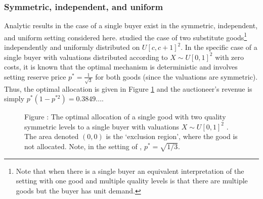 \subsubsection{Symmetric, independent, and uniform}

Analytic results in the case of a single buyer exist in the symmetric, independent, and uniform setting considered here. \autocite{pavlov2011optimal} studied the case of two substitute goods\footnote{Note that when there is a single buyer an equivalent interpretation of the setting with one good and multiple quality levels is that there are multiple goods but the buyer has unit demand.} independently and uniformly distributed on $U[c,c+1]^2$. In the specific case of a single buyer with valuations distributed according to $X \sim U[0,1]^2$ with zero costs, it is known that the optimal mechanism is deterministic and involves setting reserve price $p^* =\frac{1}{\sqrt{3}}$ for both goods (since the valuations are symmetric). Thus, the optimal allocation is given in Figure \ref{fig:pavlov_alloc} and the auctioneer's revenue is simply $p^*( 1 - p^{*2} ) = 0.3849...$.
 
\begin{figure}[H]
    \begin{center}
    \end{center}
  
    \vspace{1mm}
    \raggedright{\small {\sc Figure \thefig\label{fig:pavlov_alloc}:} The optimal allocation of a single good with two quality symmetric levels to a single buyer with valuations $X \sim U[0,1]^2$ \autocite{pavlov2011optimal}. The area denoted $(0,0)$ is the `exclusion region', where the good is not allocated. Note, in the setting of \autocite{pavlov2011optimal}, $p^*=\sqrt{1/3}$.}
\end{figure}

